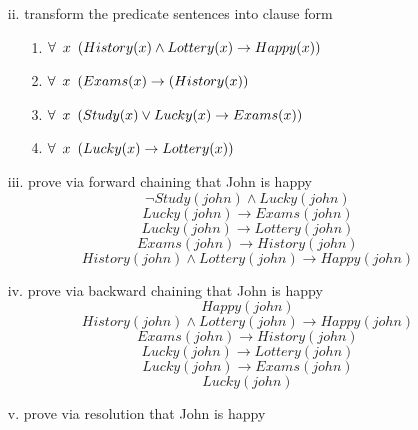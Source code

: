 \documentclass[11pt]{article}
\begin{document}
\begin{flushleft}
\begin{enumerate}
\begin{enumerate}
            \item[ii.] transform the predicate sentences into clause form
                \begin{enumerate}
                    \item[1.] $\forall \hspace{0.5em} x \hspace{0.5em}
                        (History(x) \wedge Lottery(x) \rightarrow Happy(x))$
                    \item[2.] $\forall \hspace{0.5em} x \hspace{0.5em}
                        (Exams(x) \rightarrow (History(x))$
                    \item[3.] $\forall \hspace{0.5em} x \hspace{0.5em}
                        (Study(x) \vee Lucky(x) \rightarrow Exams(x))$
                    \item[4.] $\forall \hspace{0.5em} x \hspace{0.5em}
                        (Lucky(x) \rightarrow Lottery(x))$
                \end{enumerate}

            \item[iii.] prove via forward chaining that John is happy
                $$ \neg Study(john) \wedge Lucky(john) $$
                $$ Lucky(john) \rightarrow Exams(john) $$
                $$ Lucky(john) \rightarrow Lottery(john) $$
                $$ Exams(john) \rightarrow History(john) $$
                $$ History(john) \wedge Lottery(john) \rightarrow Happy(john) $$

            \item[iv.] prove via backward chaining that John is happy
                $$ Happy(john) $$
                $$ History(john) \wedge Lottery(john) \rightarrow Happy(john) $$
                $$ Exams(john) \rightarrow History(john) $$
                $$ Lucky(john) \rightarrow Lottery(john) $$
                $$ Lucky(john) \rightarrow Exams(john) $$
                $$ Lucky(john) $$

            \item[v.] prove via resolution that John is happy
        \end{enumerate}

\end{enumerate}

\end{flushleft}
\end{document}

